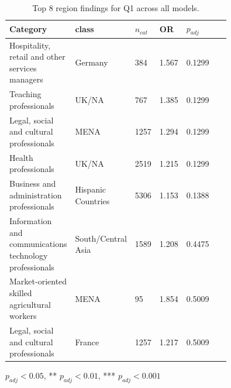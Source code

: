 \begin{table}[t]
\centering
\small
\caption{Top 8 region findings for Q1 across all models.}
\label{tab:summary-q1-region}
\begin{tabular}{p{0.26\linewidth}p{0.14\linewidth}p{0.07\linewidth}p{0.08\linewidth}p{0.20\linewidth}}
\setlength{\tabcolsep}{3pt}
\toprule
\textbf{Category} & \textbf{class} & \textbf{$n_{cat}$} & \textbf{OR} & \textbf{$p_{adj}$} \\
\midrule
Hospitality, retail and other services managers & Germany & 384 & 1.567 & 0.1299 \\
\midrule
Teaching professionals & UK/NA & 767 & 1.385 & 0.1299 \\
\midrule
Legal, social and cultural professionals & MENA & 1257 & 1.294 & 0.1299 \\
\midrule
Health professionals & UK/NA & 2519 & 1.215 & 0.1299 \\
\midrule
Business and administration professionals & Hispanic Countries & 5306 & 1.153 & 0.1388 \\
\midrule
Information and communications technology professionals & South/Central Asia & 1589 & 1.208 & 0.4475 \\
\midrule
Market-oriented skilled agricultural workers & MENA & 95 & 1.854 & 0.5009 \\
\midrule
Legal, social and cultural professionals & France & 1257 & 1.217 & 0.5009 \\
\bottomrule
\end{tabular}
\par\smallskip
{\footnotesize * $p_{adj} < 0.05$, ** $p_{adj} < 0.01$, *** $p_{adj} < 0.001$}
\end{table}
